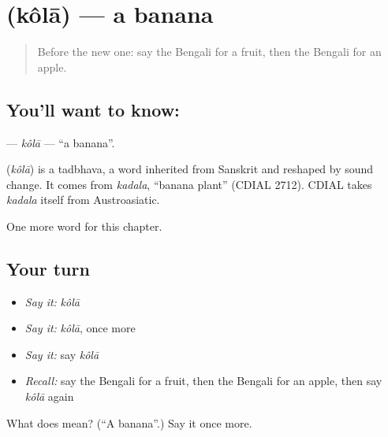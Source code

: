 \section[\texorpdfstring{\bn{কলা} (kôlā)}{কলা (kôlā)}]{ (kôlā) — a banana}

\label{lesson:BN-C56-kola}



\begin{quote}
Before the new one: say the Bengali for a fruit, then the Bengali for an apple.
\end{quote}

\subsection*{You'll want to know: }
\textbf{} — \emph{kôlā} — \textquotedblleft{}a banana\textquotedblright{}.

\begin{cousinweb}
\textbf{} (\emph{kôlā}) is a tadbhava, a word inherited from Sanskrit and reshaped by sound change. It comes from \emph{kadala}, \textquotedblleft{}banana plant\textquotedblright{} (CDIAL 2712). CDIAL takes \emph{kadala} itself from Austroasiatic.
\end{cousinweb}

\begin{grammarlens}[title={What you've built}]
One more word for this chapter.
\end{grammarlens}

\subsection*{Your turn}
\begin{itemize}
\raggedright
  \item \emph{Say it:} \emph{kôlā}
  \item \emph{Say it:} \emph{kôlā}, once more
  \item \emph{Say it:} say \emph{kôlā}
  \item \emph{Recall:} say the Bengali for a fruit, then the Bengali for an apple, then say \emph{kôlā} again
\end{itemize}

\begin{tcolorbox}[breakable,colback=teal!4,colframe=teal!35!black,title={Before you move on}]
What does  mean? (\textquotedblleft{}A banana\textquotedblright{}.) Say it once more.
\end{tcolorbox}
